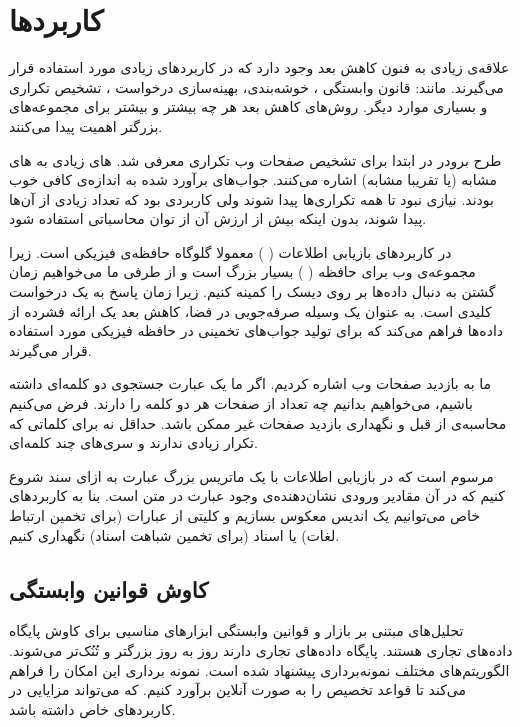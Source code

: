 \section{کاربردها}

علاقه‌ی زیادی به فنون کاهش بعد وجود دارد که در کاربردهای زیادی مورد استفاده قرار می‌گیرند. مانند: قانون وابستگی%
\cite{litez30, litez31}
، خوشه‌بندی، بهینه‌سازی درخواست%
\cite{litez136, litez44}
، تشخیص تکراری%
\cite{litez34, litez28}
و بسیاری موارد دیگر. روش‌های کاهش بعد هر چه بیشتر و بیشتر برای مجموعه‌های بزرگتر اهمیت پیدا می‌کنند.

طرح برودر%
\cite{litez34}
در ابتدا برای تشخیص صفحات وب تکراری معرفی شد. 
%
های زیادی به 
%
های مشابه (یا تقریبا مشابه) اشاره می‌کنند. جواب‌های برآورد شده به اندازه‌ی کافی خوب بودند. نیازی نبود تا همه تکراری‌ها پیدا شوند ولی کاربردی بود که تعداد زیادی از آن‌ها پیدا شوند، بدون اینکه بیش از ارزش آن از توان محاسباتی استفاده شود.

در کاربردهای بازیابی اطلاعات (%
%
)%
معمولا گلوگاه حافظه‌ی فیزیکی است. زیرا مجموعه‌ی وب برای حافظه (%
%
) بسیار بزرگ است و از طرفی ما می‌خواهیم زمان گشتن به دنبال داده‌ها بر روی دیسک را کمینه کنیم. زیرا زمان پاسخ به یک درخواست کلیدی است.
\cite{litez29}
 به عنوان یک وسیله صرفه‌جویی در فضا، کاهش بعد یک ارائه فشرده از داده‌ها فراهم می‌کند که برای تولید جواب‌های تخمینی در حافظه فیزیکی مورد استفاده قرار می‌گیرند.

ما به بازدید صفحات وب اشاره‌ کردیم. اگر ما یک عبارت جستجوی دو کلمه‌ای داشته باشیم، می‌خواهیم بدانیم چه تعداد از صفحات هر دو کلمه را دارند. فرض می‌کنیم محاسبه‌ی از قبل و نگهداری بازدید صفحات غیر ممکن باشد. حداقل نه برای کلماتی که تکرار زیادی ندارند و سری‌های چند کلمه‌ای.

مرسوم است که در بازیابی اطلاعات با یک ماتریس بزرگ عبارت به ازای سند شروع کنیم که در آن مقادیر ورودی نشان‌دهنده‌ی وجود عبارت در متن است. بنا به کاربردهای خاص می‌توانیم یک اندیس معکوس %
بسازیم و کلیتی از عبارات (برای تخمین ارتباط لغات) یا اسناد (برای تخمین شباهت اسناد) نگهداری کنیم.

\subsection{
کاوش قوانین وابستگی
}
تحلیل‌های مبتنی بر بازار و قوانین وابستگی 
\cite{litez8, litez9, litez10}
ابزارهای مناسبی برای کاوش پایگاه‌ داده‌های تجاری هستند. پایگاه داده‌های تجاری دارند روز به روز بزرگتر و تُنُک‌تر می‌شوند.
\cite{litez7, litez158}
الگوریتم‌های مختلف نمونه‌برداری پیشنهاد شده است. نمونه برداری این امکان را فراهم می‌کند تا قواعد تخصیص را به صورت آنلاین برآورد کنیم. که می‌تواند مزایایی در کاربردهای خاص داشته باشد.

